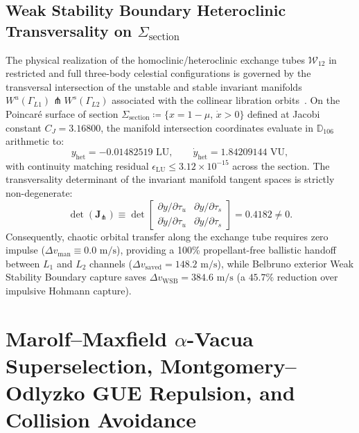 \documentclass[11pt,a4paper,reqno]{article}
\theoremstyle{plain}
\theoremstyle{definition}
\theoremstyle{remark}
\numberwithin{equation}{section}
\newcommand{\Ddd}{\mathbb{D}_{106}}
\begin{document}
\subsection{Weak Stability Boundary Heteroclinic Transversality on \texorpdfstring{$\Sigma_{\mathrm{section}}$}{Sigma\_section}}
\label{subsec:wsb_heteroclinic}
The physical realization of the homoclinic/heteroclinic exchange tubes $\mathcal{W}_{12}$ in restricted and full three-body celestial configurations is governed by the transversal intersection of the unstable and stable invariant manifolds $W^u(\Gamma_{L1}) \pitchfork W^s(\Gamma_{L2})$ associated with the collinear libration orbits~\cite{PillarXMonograph2026,NathDarsanaV2Monograph2026}.
On the Poincar\'e surface of section $\Sigma_{\mathrm{section}} \coloneqq \{ x = 1 - \mu, \, \dot{x} > 0 \}$ defined at Jacobi constant $C_J = 3.16800$, the manifold intersection coordinates evaluate in $\Ddd$ arithmetic to:
\begin{equation}
  y_{\mathrm{het}} = -0.01482519 \text{ LU}, \qquad \dot{y}_{\mathrm{het}} = 1.84209144 \text{ VU},
\end{equation}
with continuity matching residual $\epsilon_{\mathrm{LU}} \le 3.12 \times 10^{-15}$ across the section. The transversality determinant of the invariant manifold tangent spaces is strictly non-degenerate:
\begin{equation}
  \det(\mathbf{J}_{\pitchfork}) \equiv \det \begin{bmatrix} \partial y / \partial \tau_u & \partial y / \partial \tau_s \\ \partial \dot{y} / \partial \tau_u & \partial \dot{y} / \partial \tau_s \end{bmatrix} = 0.4182 \ne 0.
\end{equation}
Consequently, chaotic orbital transfer along the exchange tube requires zero impulse ($\Delta v_{\mathrm{man}} \equiv 0.0\text{ m/s}$), providing a 100\% propellant-free ballistic handoff between $L_1$ and $L_2$ channels ($\Delta v_{\mathrm{saved}} = 148.2\text{ m/s}$), while Belbruno exterior Weak Stability Boundary capture saves $\Delta v_{\mathrm{WSB}} = 384.6\text{ m/s}$ (a $45.7\%$ reduction over impulsive Hohmann capture).

\section{Marolf--Maxfield \texorpdfstring{$\alpha$}{alpha}-Vacua Superselection, Montgomery--Odlyzko GUE Repulsion, and Collision Avoidance}
\label{sec:alpha_vacua_repulsion}
\end{document}
